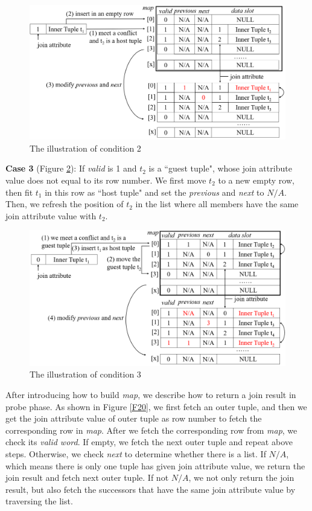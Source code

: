     \begin{figure}[htb]
        \centering
        \includegraphics[width=\linewidth]{./pic/Figure18.png}
        \caption{The illustration of condition 2}
        \label{F18}
        \Description{}
    \end{figure}\par
    \textbf{Case 3} (Figure \ref{F19}): If \textit{valid} is 1 and $t_2$ is a ``guest tuple", whose join attribute value does not equal to its row number. We first move $t_2$ to a new empty row, then fit $t_1$ in this row as ``host tuple" and set the \textit{previous} and \textit{next} to $N/A$. Then, we refresh the position of $t_2$ in the list where all members have the same join attribute value with $t_2$.
    \begin{figure}[htb]
        \centering
        \includegraphics[width=\linewidth]{./pic/Figure19.png}
        \caption{The illustration of condition 3}
        \label{F19}
        \Description{}
    \end{figure}\par
    After introducing how to build \textit{map}, we describe how to return a join result in probe phase. As shown in Figure \ref{F20}, we first fetch an outer tuple, and then we get the join attribute value of outer tuple as row number to fetch the corresponding row in \textit{map}. After we fetch the corresponding row from \textit{map}, we check its \textit{valid word}. If empty, we fetch the next outer tuple and repeat above steps. Otherwise, we check \textit{next} to determine whether there is a list. If $N/A$, which means there is only one tuple has given join attribute value, we return the join result and fetch next outer tuple. If not $N/A$, we not only return the join result, but also fetch the successors that have the same join attribute value by traversing the list.
